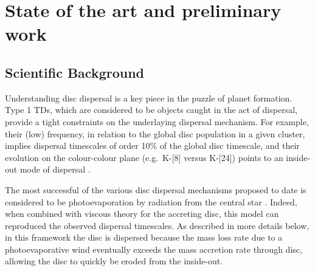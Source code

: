 \documentclass[10pt,fleqn,twoside]{article}
\begin{document}
\section{State of the art and preliminary work}
\renewcommand{\leftmark}{\sc State of the Art and preliminary work}

\subsection{Scientific Background}

Understanding disc dispersal is a key piece in the puzzle of planet
formation. Type 1 TDs, which are considered to be objects caught in
the act of dispersal, provide a tight constraints on the underlaying
dispersal mechanism. For example, their (low) frequency, in relation
to the global disc population in a given cluster, implies dispersal
timescales of order 10\% of the global disc timescale, and their
evolution on the colour-colour plane (e.g.\ K-[8] versus K-[24]) points
to an inside-out mode of 
dispersal \citep[e.g.,][]{2011MNRAS.410..671E, 2013MNRAS.428.3327K,
2015MNRAS.452.3689E}.

The most successful of the various disc dispersal mechanisms
proposed to date is considered to be photoevaporation by radiation
from the central star
\citep[e.g.,][]{2001MNRAS.328..485C}. Indeed, when combined with
viscous theory for the accreting disc, this model can
reproduced the observed dispersal timescales. 
As described in more details below, in this
framework the disc is dispersed because
the mass loss rate due to a photoevaporative wind eventually exceeds the mass accretion
rate through disc, allowing the disc to quickly be eroded from the inside-out.
\end{document}
